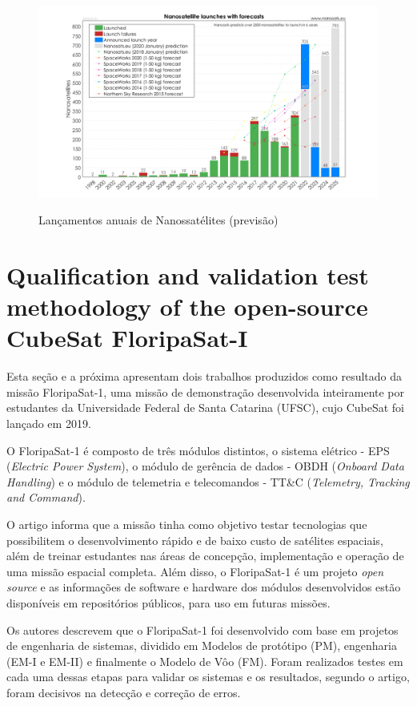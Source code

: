 \begin{figure}[h!]
    \centering
    \caption{Lançamentos anuais de Nanossatélites (previsão)}
    \includegraphics[width=\textwidth]{images/nanosat_years_forecast.png}
    \label{fig:nanosats_years_forecast}
\end{figure}


\section{Qualification and validation test methodology of the open-source CubeSat FloripaSat-I \texorpdfstring{\cite{marcelino2020-2}}{} }
\label{relacionados:marcelino2020-2}
Esta seção e a próxima apresentam dois trabalhos produzidos como resultado da missão FloripaSat-1, uma missão de demonstração desenvolvida inteiramente por estudantes da Universidade Federal de Santa Catarina (UFSC), cujo CubeSat foi lançado em 2019.

O FloripaSat-1 é composto de três módulos distintos, o sistema elétrico - EPS (\textit{Electric Power System}), o módulo de gerência de dados - OBDH (\textit{Onboard Data Handling}) e o módulo de telemetria e telecomandos - TT\&C (\textit{Telemetry, Tracking and Command}).

O artigo informa que a missão tinha como objetivo testar tecnologias que possibilitem o desenvolvimento rápido e de baixo custo de satélites espaciais, além de treinar estudantes nas áreas de concepção, implementação e operação de uma missão espacial completa. Além disso, o FloripaSat-1 é um projeto \textit{open source} e as informações de software e hardware dos módulos desenvolvidos estão disponíveis em repositórios públicos, para uso em futuras missões.

Os autores descrevem que o FloripaSat-1 foi desenvolvido com base em projetos de engenharia de sistemas, dividido em Modelos de protótipo (PM), engenharia (EM-I e EM-II) e finalmente o Modelo de Vôo (FM). Foram realizados testes em cada uma dessas etapas para validar os sistemas e os resultados, segundo o artigo, foram decisivos na detecção e correção de erros.

